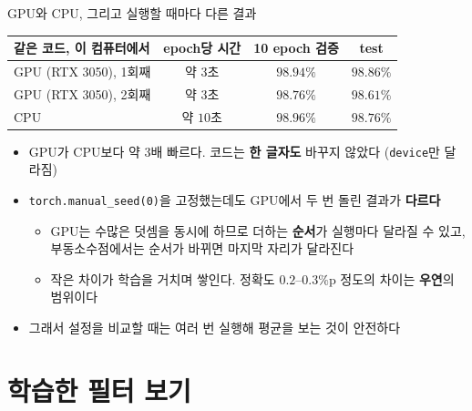 \documentclass[aspectratio=169,11pt]{beamer}
\newcommand{\code}[1]{\texttt{#1}}
\begin{document}
\begin{frame}{GPU와 CPU, 그리고 실행할 때마다 다른 결과}
\centering
\small
\renewcommand{\arraystretch}{1.3}
\begin{tabular}{lccc}
\toprule
\textbf{같은 코드, 이 컴퓨터에서} & \textbf{epoch당 시간} & \textbf{10 epoch 검증} & \textbf{test} \\
\midrule
GPU (RTX 3050), 1회째 & 약 $3$초 & $98.94\%$ & $98.86\%$ \\
GPU (RTX 3050), 2회째 & 약 $3$초 & $98.76\%$ & $98.61\%$ \\
CPU & 약 $10$초 & $98.96\%$ & $98.76\%$ \\
\bottomrule
\end{tabular}
\raggedright
\vskip3mm
\begin{itemize}
\item GPU가 CPU보다 약 $3$배 빠르다. 코드는 \textbf{한 글자도} 바꾸지 않았다 (\code{device}만 달라짐)
\item \code{torch.manual\_seed(0)}을 고정했는데도 GPU에서 두 번 돌린 결과가 \textbf{다르다}
\begin{itemize}
\item GPU는 수많은 덧셈을 동시에 하므로 더하는 \textbf{순서}가 실행마다 달라질 수 있고, 부동소수점에서는 순서가 바뀌면 마지막 자리가 달라진다
\item 작은 차이가 학습을 거치며 쌓인다. 정확도 $0.2$--$0.3\%$p 정도의 차이는 \textbf{우연}의 범위이다
\end{itemize}
\item 그래서 설정을 비교할 때는 여러 번 실행해 평균을 보는 것이 안전하다
\end{itemize}
\end{frame}

\section{학습한 필터 보기}
\end{document}
